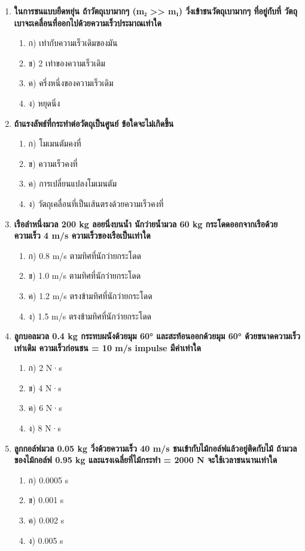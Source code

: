 \documentclass[12pt]{article}
\begin{document}
\begin{enumerate}
\begin{enumerate}
\item ง) 1.6 m/s ไปทางเดิมของ B
\end{enumerate}
\item \textbf{ในการชนแบบยืดหยุ่น ถ้าวัตถุเบามากๆ (m₂ >> m₁) วิ่งเข้าชนวัตถุเบามากๆ ที่อยู่กับที่ วัตถุเบาจะเคลื่อนที่ออกไปด้วยความเร็วประมาณเท่าใด}
\begin{enumerate}
\item ก) เท่ากับความเร็วเดิมของมัน
\item ข) 2 เท่าของความเร็วเดิม
\item ค) ครึ่งหนึ่งของความเร็วเดิม
\item ง) หยุดนิ่ง
\end{enumerate}
\item \textbf{ถ้าแรงลัพธ์ที่กระทำต่อวัตถุเป็นศูนย์ ข้อใดจะไม่เกิดขึ้น}
\begin{enumerate}
\item ก) โมเมนตัมคงที่
\item ข) ความเร็วคงที่
\item ค) การเปลี่ยนแปลงโมเมนตัม
\item ง) วัตถุเคลื่อนที่เป็นเส้นตรงด้วยความเร็วคงที่
\end{enumerate}
\item \textbf{เรือลำหนึ่งมวล 200 kg ลอยนิ่งบนน้ำ นักว่ายน้ำมวล 60 kg กระโดดออกจากเรือด้วยความเร็ว 4 m/s ความเร็วของเรือเป็นเท่าใด}
\begin{enumerate}
\item ก) 0.8 m/s ตามทิศที่นักว่ายกระโดด
\item ข) 1.0 m/s ตามทิศที่นักว่ายกระโดด
\item ค) 1.2 m/s ตรงข้ามทิศที่นักว่ายกระโดด
\item ง) 1.5 m/s ตรงข้ามทิศที่นักว่ายกระโดด
\end{enumerate}
\item \textbf{ลูกบอลมวล 0.4 kg กระทบผนังด้วยมุม 60° และสะท้อนออกด้วยมุม 60° ด้วยขนาดความเร็วเท่าเดิม ความเร็วก่อนชน = 10 m/s impulse มีค่าเท่าใด}
\begin{enumerate}
\item ก) 2 N·s
\item ข) 4 N·s
\item ค) 6 N·s
\item ง) 8 N·s
\end{enumerate}
\item \textbf{ลูกกอล์ฟมวล 0.05 kg วิ่งด้วยความเร็ว 40 m/s ชนเข้ากับไม้กอล์ฟแล้วอยู่ติดกับไม้ ถ้ามวลของไม้กอล์ฟ 0.95 kg และแรงเฉลี่ยที่ไม้กระทำ = 2000 N จะใช้เวลาชนนานเท่าใด}
\begin{enumerate}
\item ก) 0.0005 s
\item ข) 0.001 s
\item ค) 0.002 s
\item ง) 0.005 s
\end{enumerate}
\end{enumerate}
\end{document}
